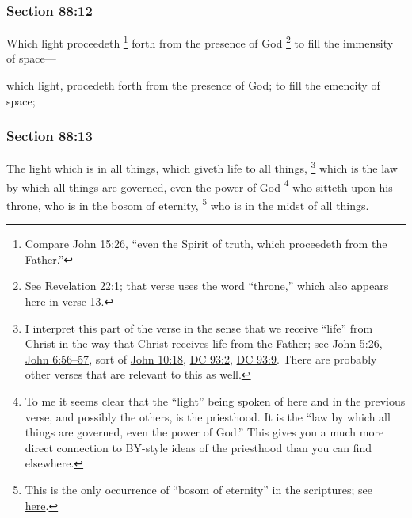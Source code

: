 	\subsubsection{Section 88:12} %
		\label{DC88-12}

		Which light proceedeth%
			\footnote{%
				Compare \hyperref[JOHN-15-26]{John 15:26}, ``even the Spirit of truth, which proceedeth from the Father.''
				}
		forth from the presence of God%
			\footnote{%
				See \hyperref[REVELATIONNT-22-1]{Revelation 22:1}; that verse uses the word ``throne,'' which also appears here in verse 13.
				}
		to fill the immensity of space---

		\begin{framed}
		\scriptsize
			\begin{compactdesc}
				\item[JSP] which light, procedeth forth from the presence of God; to fill the emencity of space;
			\end{compactdesc}
		\end{framed}

	\subsubsection{Section 88:13} %
		\label{DC88-13}

		The light which is in all things, which giveth life to all things,%
			\footnote{%
				I interpret this part of the verse in the sense that we receive ``life'' from Christ in the way that Christ receives life from the Father; see \hyperref[JOHN-5-26]{John 5:26}, \hyperref[JOHN-6-56]{John 6:56--57}, sort of \hyperref[JOHN-10-18]{John 10:18}, \hyperref[DC93-2]{DC 93:2}, \hyperref[DC93-9]{DC 93:9}. There are probably other verses that are relevant to this as well.
				}
		which is the law by which all things are governed, even the power of God%
			\footnote{%
				To me it seems clear that the ``light'' being spoken of here and in the previous verse, and possibly the others, is the priesthood. It is the ``law by which all things are governed, even the power of God.'' This gives you a much more direct connection to BY-style ideas of the priesthood than you can find elsewhere.
				}
		who sitteth upon his throne, who is in the \hyperref[BOSOM]{bosom} of eternity,%
			\footnote{%
				This is the only occurrence of ``bosom of eternity'' in the scriptures; see \hyperref[BOSOM-PHRASES]{here}.
				} 
		who is in the midst of all things.

